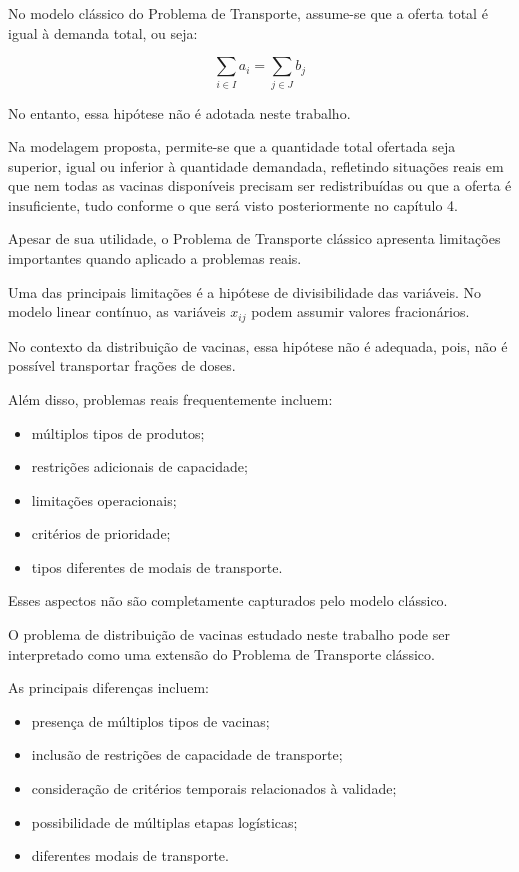 No modelo clássico do Problema de Transporte, assume-se que a oferta total é igual à demanda total, ou seja:

\[
\sum_{i \in I} a_i = \sum_{j \in J} b_j
\]

No entanto, essa hipótese não é adotada neste trabalho.

Na modelagem proposta, permite-se que a quantidade total ofertada seja superior, igual ou inferior à quantidade demandada, refletindo situações reais em que nem todas as vacinas disponíveis precisam ser redistribuídas ou que a oferta é insuficiente, tudo conforme o que será visto posteriormente no capítulo 4.

Apesar de sua utilidade, o Problema de Transporte clássico apresenta limitações importantes quando aplicado a problemas reais.

Uma das principais limitações é a hipótese de divisibilidade das variáveis. No modelo linear contínuo, as variáveis $x_{ij}$ podem assumir valores fracionários.

No contexto da distribuição de vacinas, essa hipótese não é adequada, pois, não é possível transportar frações de doses.


Além disso, problemas reais frequentemente incluem:
\begin{itemize}
    \item múltiplos tipos de produtos;
    \item restrições adicionais de capacidade;
    \item limitações operacionais;
    \item critérios de prioridade;
    \item tipos diferentes de modais de transporte.
\end{itemize}

Esses aspectos não são completamente capturados pelo modelo clássico.

O problema de distribuição de vacinas estudado neste trabalho pode ser interpretado como uma extensão do Problema de Transporte clássico.

As principais diferenças incluem:

\begin{itemize}
    \item presença de múltiplos tipos de vacinas;
    \item inclusão de restrições de capacidade de transporte;
    \item consideração de critérios temporais relacionados à validade;
    \item possibilidade de múltiplas etapas logísticas;
    \item diferentes modais de transporte.
\end{itemize}

